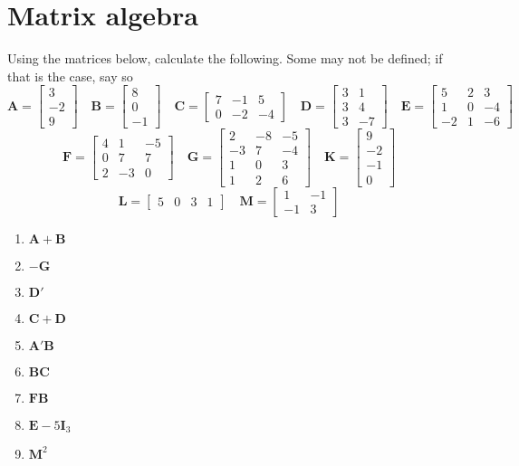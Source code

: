 \documentclass[12pt]{article}
\begin{document}
\section{Matrix algebra}
Using the matrices below, calculate the following. Some may not be defined; if that is the case, say so
\[ \mathbf{A} = \begin{bmatrix}
    3 \\ -2 \\ 9\end{bmatrix} \quad
    \mathbf{B} = \begin{bmatrix}
        8\\0\\-1    \end{bmatrix} \quad 
        \mathbf{C} = \begin{bmatrix}
    7&-1&5 \\ 0&-2&-4\end{bmatrix} \quad
    \mathbf{D} = \begin{bmatrix}
    3&1 \\ 3&4 \\ 3&-7\end{bmatrix} \quad
    \mathbf{E} = \begin{bmatrix}
    5&2&3 \\ 1&0&-4\\-2&1&-6\end{bmatrix} \quad
\]
\[\mathbf{F} = \begin{bmatrix}
    4&1&-5 \\ 0&7&7 \\ 2&-3&0\end{bmatrix} \quad
    \mathbf{G} = \begin{bmatrix}
    2&-8&-5 \\ -3&7&-4\\ 1&0&3 \\ 1&2&6\end{bmatrix} \quad
    \mathbf{K} = \begin{bmatrix}
    9\\-2\\-1\\0\end{bmatrix} \quad
    \]
\[\mathbf{L} = \begin{bmatrix}
     5&0&3&1\end{bmatrix} \quad
     \mathbf{M} = \begin{bmatrix}
    1&-1 \\ -1&3\end{bmatrix} \quad
    \]
\begin{enumerate}
    \item $\mathbf{A}+\mathbf{B}$
    \item $-\mathbf{G}$
    \item $\mathbf{D}'$
    \item $\mathbf{C}+\mathbf{D}$
    \item $\mathbf{A}'\mathbf{B}$
    \item $\mathbf{B}\mathbf{C}$
    \item $\mathbf{F}\mathbf{B}$
    \item $\mathbf{E}-5\mathbf{I}_3$
    \item $\mathbf{M}^2$
\end{enumerate}
\end{document}
